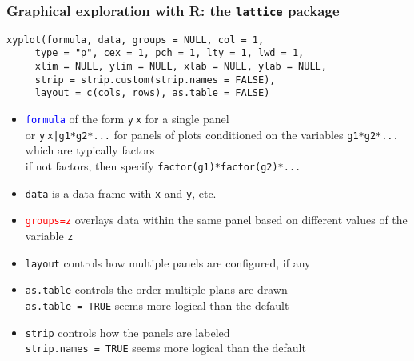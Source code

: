 \documentclass[11pt,pdftex,dvipsnames,usenames,helvetica]{beamer}
\begin{document}
\begin{frame}[fragile]
\frametitle{Graphical exploration with R: the {\tt lattice} package}
\begin{verbatim}
xyplot(formula, data, groups = NULL, col = 1,
     type = "p", cex = 1, pch = 1, lty = 1, lwd = 1,
     xlim = NULL, ylim = NULL, xlab = NULL, ylab = NULL, 
     strip = strip.custom(strip.names = FALSE),
     layout = c(cols, rows), as.table = FALSE)
\end{verbatim}
\begin{itemize}
\item \textcolor{blue}{\tt formula} of the form {\tt y$~$x} for a single panel \\
  or {\tt y$~$x|g1*g2*...} for panels of plots conditioned on the
  variables {\tt g1*g2*...} which are typically
  factors\\
  if not factors, then specify {\tt factor(g1)*factor(g2)*...}
\item {\tt data} is a data frame with {\tt x} and {\tt y}, etc.
\item \textcolor{red}{\tt groups=z} overlays data within the same panel
based on different values of the variable {\tt z}
\item {\tt layout} controls how multiple panels are configured, if any
\item {\tt as.table} controls the order multiple plans are drawn\\
{\tt as.table = TRUE} seems more logical than the default
\item {\tt strip} controls how the panels are labeled \\
{\tt strip.names = TRUE} seems more logical than the default
\end{itemize}

\end{frame}
\end{document}
